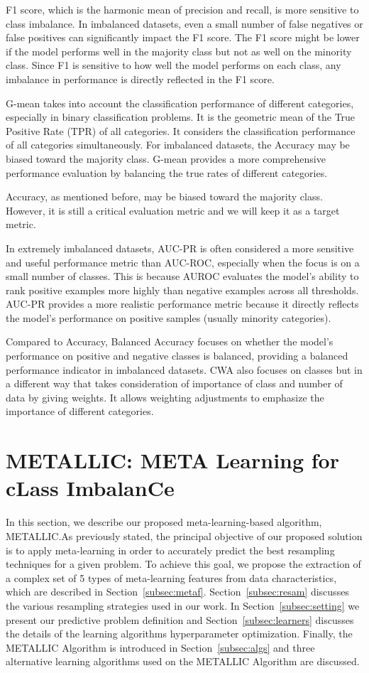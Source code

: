 \documentclass{article}
\begin{document}
F1 score, which is the harmonic mean of precision and recall, is more sensitive to class imbalance. In imbalanced datasets, even a small number of false negatives or false positives can significantly impact the F1 score. The F1 score might be lower if the model performs well in the majority class but not as well on the minority class. Since F1 is sensitive to how well the model performs on each class, any imbalance in performance is directly reflected in the F1 score.

G-mean takes into account the classification performance of different categories, especially in binary classification problems. It is the geometric mean of the True Positive Rate (TPR) of all categories. It considers the classification performance of all categories simultaneously. For imbalanced datasets, the Accuracy may be biased toward the majority class. G-mean provides a more comprehensive performance evaluation by balancing the true rates of different categories.

Accuracy, as mentioned before, may be biased toward the majority class. However, it is still a critical evaluation metric and we will keep it as a target metric.

In extremely imbalanced datasets, AUC-PR is often considered a more sensitive and useful performance metric than AUC-ROC, especially when the focus is on a small number of classes. This is because AUROC  evaluates the model’s ability to rank positive examples more highly than negative examples across all thresholds. AUC-PR provides a more realistic performance metric because it directly reflects the model's performance on positive samples (usually minority categories).

Compared to Accuracy, Balanced Accuracy focuses on whether the model's performance on positive and negative classes is balanced, providing a balanced performance indicator in imbalanced datasets. CWA also focuses on classes but in a different way that takes consideration of importance of class and number of data by giving weights. It allows weighting adjustments to emphasize the importance of different categories.

 
 \section{METALLIC: META Learning for cLass ImbalanCe} \label{sec:METALLIC}
In this section, we describe our proposed meta-learning-based algorithm, METALLIC.\@ As previously stated, the principal objective of our proposed solution is to apply meta-learning in order to accurately predict the best resampling techniques for a given problem. To achieve this goal, we propose the extraction of a complex set of 5 types of meta-learning features from data characteristics, which are described in Section~\autoref{subsec:metaf}. Section~\autoref{subsec:resam} discusses the various resampling strategies used in our work. In Section~\autoref{subsec:setting} we present our predictive problem definition and Section~\autoref{subsec:learners} discusses the details of the learning algorithms hyperparameter optimization. Finally, the METALLIC Algorithm is introduced in Section~\autoref{subsec:algs} and three alternative learning algorithms used on the METALLIC Algorithm are discussed.
\end{document}
